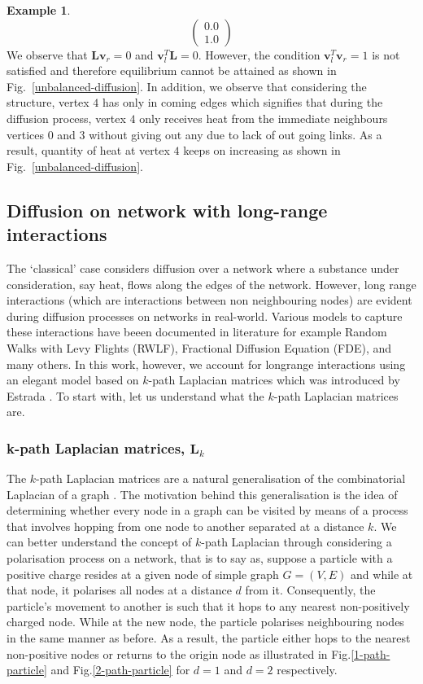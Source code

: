 \documentclass[10pt,a4paper]{article}
\theoremstyle{plain}
\theoremstyle{definition}
\newtheorem{exa}[subsection]{Example}
\begin{document}
\begin{exa}
\begin{equation*}
\begin{pmatrix}
   0.0 \\
   1.0
   \end{pmatrix}
   \end{equation*}
   We observe that $\mathbf{L} \mathbf{v}_r = 0$ and $\mathbf{v}_l^T \mathbf{L} = 0$. However, the condition $\mathbf{v}_l^T \mathbf{v}_r = 1$  is not satisfied and therefore equilibrium cannot be attained as shown in Fig.~\ref{unbalanced-diffusion}. In addition, we observe that considering the structure, vertex $4$ has only in coming edges which signifies that during the diffusion process, vertex $4$ only receives heat from the immediate neighbours vertices $0$ and $3$ without giving out any due to lack of out going links. As a result, quantity of heat at vertex $4$ keeps on increasing as shown in Fig.~\ref{unbalanced-diffusion}.
   \end{exa}
	
    \subsection{Diffusion on network with long-range interactions}
    The `classical' case considers diffusion over a network where a substance under consideration, say heat, flows along the edges of the network. However, long range interactions (which are interactions between non neighbouring nodes) are evident during diffusion processes on networks in real-world. Various models to capture these interactions have beeen documented in literature for example Random Walks with Levy Flights (RWLF), Fractional Diffusion Equation (FDE), and many others. In this work, however, we account for longrange interactions using an elegant model based on $k$-path Laplacian matrices which was introduced by Estrada \citep{estrada2017path}. To start with, let us understand what the $k$-path Laplacian matrices are.
    	    \subsubsection{ k-path Laplacian matrices, $\mathbf{L}_k$}
    	    The $k$-path Laplacian matrices are a natural generalisation of the combinatorial Laplacian of a graph \citep{estrada2012path}. The motivation behind this generalisation is the idea of determining whether every node in a graph can be visited by means of a process that involves hopping from one node to another separated at a distance $k$. We can better understand the concept of $k$-path Laplacian through considering a polarisation process on a network, that is to say as, suppose a particle with a positive charge resides at a given node of simple graph $G= (V,E)$ and while at that node, it polarises all nodes at a distance $d$ from it. Consequently, the particle's movement to another is such that it hops to any nearest non-positively charged node. While at the new node, the particle polarises neighbouring nodes in the same manner as before. As a result, the particle either hops to the nearest non-positive nodes or returns to the origin node as illustrated in Fig.\ref{1-path-particle} and Fig.\ref{2-path-particle} for $d=1$ and $d=2$ respectively.
    	    
\end{document}

